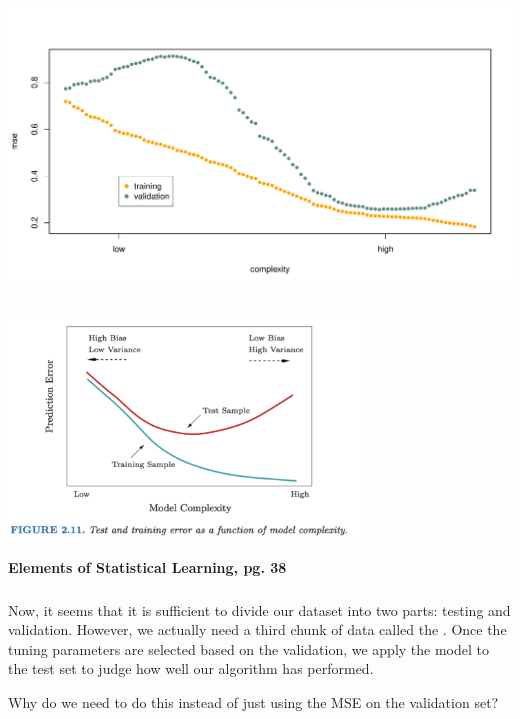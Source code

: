 \documentclass[xetex,mathserif,serif,aspectratio=169]{beamer}
\begin{document}
\begin{frame}[fragile] \frametitle{} \oldB \small

\begin{center}
\includegraphics[width=\textwidth]{img/loessValid.pdf}
\end{center}

\end{frame}

\begin{frame}[fragile] \frametitle{} \oldB \small

\begin{center}
\includegraphics[width=0.7\textwidth]{img/pg38.pdf}
\end{center}

{\small \textbf{Elements of Statistical Learning, pg. 38}}

\end{frame}

\begin{frame}[fragile] \frametitle{} \oldB \small


Now, it seems that it is sufficient to divide our dataset into two
parts: testing and validation. However, we actually need a third
chunk of data called the . Once the tuning parameters
are selected based on the validation, we apply the model to the
test set to judge how well our algorithm has performed.

Why do we need to do this instead of just using the MSE on the
validation set?

\end{frame}
\end{document}
